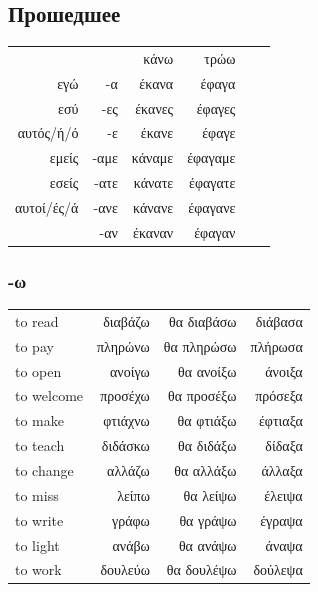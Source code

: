 \documentclass[12pt]{article}
\newcommand{\my}[1]{\textcolor{gray!80!white}{#1}}
\newenvironment{page}{\clearpage\normalsize\null\vfill}{\vfill\null}
\begin{document}
    \begin{page}
        \subsection{Прошедшее}
        \begin{tabular}{rrrrrr}
            & & κάνω & τρώω\\
            εγώ & -α & \my{έκαν}α & \my{έφαγ}α\\
            εσύ &  -ες & \my{έκαν}ες & \my{έφαγ}ες\\
            αυτός/ή/ό &  -ε & \my{έκαν}ε & \my{έφαγ}ε\\
            εμείς & -αμε & \my{κάν}αμε & \my{έφαγ}αμε\\
            εσείς & -ατε & \my{κάν}ατε & \my{έφαγ}ατε\\
            αυτοί/ές/ά & -ανε& \my{κάν}ανε & \my{έφαγ}ανε\\
            & -αν & \my{έκαν}αν & \my{έφαγ}αν\\
        \end{tabular}

        \subsubsection*{-ω}
        \begin{tabular}{lrrr}
            \my{to read}  & διαβάζω & θα διαβάσω & διάβασα \\
            \my{to pay}  & πληρώνω & θα πληρώσω & πλήρωσα \\[2mm]
            \my{to open}  & ανοίγω & θα ανοίξω & άνοιξα \\
            \my{to welcome}  & προσέχω & θα προσέξω & πρόσεξα \\
            \my{to make}  & φτιάχνω & θα φτιάξω & έφτιαξα \\
            \my{to teach}  & διδάσκω & θα διδάξω & δίδαξα \\
            \my{to change}  & αλλάζω & θα αλλάξω & άλλαξα \\[2mm]
            \my{to miss}  & λείπω & θα λείψω & έλειψα \\
            \my{to write}  & γράφω & θα γράψω & έγραψα \\
            \my{to light}  & ανάβω & θα ανάψω & άναψα \\
            \my{to work} & δουλεύω & θα δουλέψω & δούλεψα \\
        \end{tabular}
    \end{page}
\end{document}
